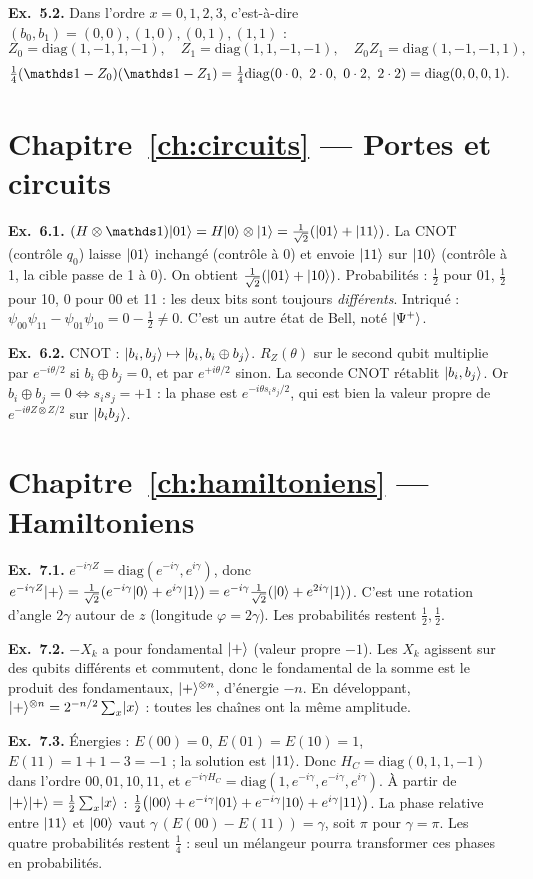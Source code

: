 \textbf{Ex.~5.2.} Dans l'ordre $x=0,1,2,3$, c'est-à-dire $(b_0,b_1)=(0,0),(1,0),(0,1),(1,1)$ :
\[Z_0=\mathrm{diag}(1,-1,1,-1),\quad Z_1=\mathrm{diag}(1,1,-1,-1),\quad Z_0Z_1=\mathrm{diag}(1,-1,-1,1),\]
\[\tfrac14(\Id-Z_0)(\Id-Z_1)=\tfrac14\mathrm{diag}(0\cdot0,\ 2\cdot0,\ 0\cdot2,\ 2\cdot2)=\mathrm{diag}(0,0,0,1).\]

\section*{Chapitre~\ref{ch:circuits} — Portes et circuits}
\textbf{Ex.~6.1.} $(H\otimes\Id)\ket{01}=H\ket0\otimes\ket1=\tfrac1{\sqrt2}(\ket{01}+\ket{11})$. La CNOT (contrôle $q_0$) laisse $\lvert 01\rangle$ inchangé (contrôle à 0) et envoie $\lvert 11\rangle$ sur $\lvert 10\rangle$ (contrôle à 1, la cible passe de 1 à 0). On obtient $\tfrac1{\sqrt2}(\lvert 01\rangle+\lvert 10\rangle)$. Probabilités : $\tfrac12$ pour 01, $\tfrac12$ pour 10, 0 pour 00 et 11 : les deux bits sont toujours \emph{différents}. Intriqué : $\psi_{00}\psi_{11}-\psi_{01}\psi_{10}=0-\tfrac12\neq0$. C'est un autre état de Bell, noté $\lvert \Psi^+\rangle$.

\textbf{Ex.~6.2.} CNOT : $\lvert b_i,b_j\rangle\mapsto\lvert b_i,b_i\oplus b_j\rangle$. $R_Z(\theta)$ sur le second qubit multiplie par $e^{-i\theta/2}$ si $b_i\oplus b_j=0$, et par $e^{+i\theta/2}$ sinon. La seconde CNOT rétablit $\lvert b_i,b_j\rangle$. Or $b_i\oplus b_j=0\Leftrightarrow s_is_j=+1$ : la phase est $e^{-i\theta s_is_j/2}$, qui est bien la valeur propre de $e^{-i\theta Z\otimes Z/2}$ sur $\lvert b_ib_j\rangle$.

\section*{Chapitre~\ref{ch:hamiltoniens} — Hamiltoniens}
\textbf{Ex.~7.1.} $e^{-i\gamma Z}=\mathrm{diag}(e^{-i\gamma},e^{i\gamma})$, donc $e^{-i\gamma Z}\lvert +\rangle=\tfrac1{\sqrt2}(e^{-i\gamma}\lvert 0\rangle+e^{i\gamma}\lvert 1\rangle)=e^{-i\gamma}\tfrac1{\sqrt2}(\lvert 0\rangle+e^{2i\gamma}\lvert 1\rangle)$. C'est une rotation d'angle $2\gamma$ autour de $z$ (longitude $\varphi=2\gamma$). Les probabilités restent $\tfrac12,\tfrac12$.

\textbf{Ex.~7.2.} $-X_k$ a pour fondamental $\lvert +\rangle$ (valeur propre $-1$). Les $X_k$ agissent sur des qubits différents et commutent, donc le fondamental de la somme est le produit des fondamentaux, $\lvert +\rangle^{\otimes n}$, d'énergie $-n$. En développant, $\lvert +\rangle^{\otimes n}=2^{-n/2}\sum_x\lvert x\rangle$ : toutes les chaînes ont la même amplitude.

\textbf{Ex.~7.3.} Énergies : $E(00)=0$, $E(01)=E(10)=1$, $E(11)=1+1-3=-1$ ; la solution est $\lvert 11\rangle$. Donc $H_C=\mathrm{diag}(0,1,1,-1)$ dans l'ordre $00,01,10,11$, et $e^{-i\gamma H_C}=\mathrm{diag}(1,e^{-i\gamma},e^{-i\gamma},e^{i\gamma})$. À partir de $\lvert +\rangle\lvert +\rangle=\tfrac12\sum_x\lvert x\rangle$ : $\tfrac12\big(\lvert 00\rangle+e^{-i\gamma}\lvert 01\rangle+e^{-i\gamma}\lvert 10\rangle+e^{i\gamma}\lvert 11\rangle\big)$. La phase relative entre $\lvert 11\rangle$ et $\lvert 00\rangle$ vaut $\gamma\,(E(00)-E(11))=\gamma$, soit $\pi$ pour $\gamma=\pi$. Les quatre probabilités restent $\tfrac14$ : seul un mélangeur pourra transformer ces phases en probabilités.

